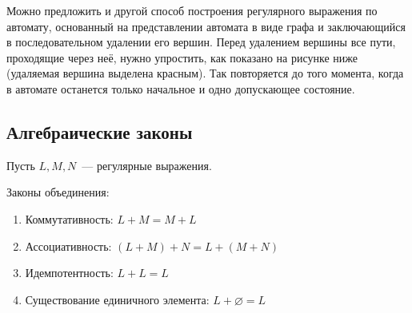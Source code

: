 Можно предложить и другой способ построения регулярного выражения по автомату, основанный на представлении автомата в виде графа и заключающийся в последовательном удалении его вершин.
Перед удалением вершины все пути, проходящие через неё, нужно упростить, как показано на рисунке ниже (удаляемая вершина выделена красным).
Так повторяется до того момента, когда в автомате останется только начальное и одно допускающее состояние.

\begin{center}\noindent
{}
\end{center}

\subsection{Алгебраические законы}
Пусть $L, M, N$~--- регулярные выражения.

Законы объединения:
\begin{enumerate}
	\item Коммутативность: $L + M = M + L$
	\item Ассоциативность: $(L + M) + N = L + (M + N)$
	\item Идемпотентность: $L + L = L$
	\item Существование единичного элемента: $L + \varnothing = L$
\end{enumerate}

